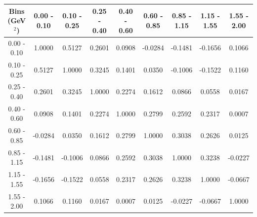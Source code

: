 \documentclass[aps, prd, reprint,showpacs,  preprintnumbers,amsmath,amssymb,superscriptaddress, nofootinbib]{revtex4-1}
\makeatletter
\renewenvironment{table}
  {\def\@captype{table}}
  {}
\makeatother
\begin{document}
\begin{table}
\centering
\begin{tabular}{ccccccccc}
\hline
Bins (GeV$^{2}$) &  0.00 - 0.10 &  0.10 - 0.25 &  0.25 - 0.40 &  0.40 - 0.60 &  0.60 - 0.85 &  0.85 - 1.15 &  1.15 - 1.55 &  1.55 - 2.00 \\ 
\hline
  0.00 -  0.10  & 1.0000  & 0.5127  & 0.2601  & 0.0908  &-0.0284  &-0.1481  &-0.1656  & 0.1066 \\
  0.10 -  0.25  & 0.5127  & 1.0000  & 0.3245  & 0.1401  & 0.0350  &-0.1006  &-0.1522  & 0.1160 \\
  0.25 -  0.40  & 0.2601  & 0.3245  & 1.0000  & 0.2274  & 0.1612  & 0.0866  & 0.0558  & 0.0167 \\
  0.40 -  0.60  & 0.0908  & 0.1401  & 0.2274  & 1.0000  & 0.2799  & 0.2592  & 0.2317  & 0.0007 \\
  0.60 -  0.85  &-0.0284  & 0.0350  & 0.1612  & 0.2799  & 1.0000  & 0.3038  & 0.2626  & 0.0125 \\
  0.85 -  1.15  &-0.1481  &-0.1006  & 0.0866  & 0.2592  & 0.3038  & 1.0000  & 0.3238  &-0.0227 \\
  1.15 -  1.55  &-0.1656  &-0.1522  & 0.0558  & 0.2317  & 0.2626  & 0.3238  & 1.0000  &-0.0667 \\
  1.55 -  2.00  & 0.1066  & 0.1160  & 0.0167  & 0.0007  & 0.0125  &-0.0227  &-0.0667  & 1.0000 \\
\hline
\hline
\end{tabular}
\caption{Correlation matrix for bins of $d\sigma/dQ^2$ for events with the selection $1.5 < E_{\nu} < 4.0$\,GeV.}
\label{tb:piz-Q2-cov}
\end{table}

\vspace{0.3cm}
\end{document}
